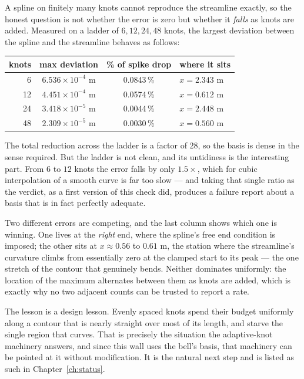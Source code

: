 A spline on finitely many knots cannot reproduce the streamline
exactly, so the honest question is not whether the error is zero but
whether it \emph{falls} as knots are added. Measured on a ladder of
$6, 12, 24, 48$ knots, the largest deviation between the spline and
the streamline behaves as follows:

\begin{center}
\begin{tabular}{rccl}
\toprule
knots & max deviation & \% of spike drop & where it sits \\
\midrule
 6 & $6.536\times10^{-4}$ m & 0.0843\,\% & $x = 2.343$ m \\
12 & $4.451\times10^{-4}$ m & 0.0574\,\% & $x = 0.612$ m \\
24 & $3.418\times10^{-5}$ m & 0.0044\,\% & $x = 2.448$ m \\
48 & $2.309\times10^{-5}$ m & 0.0030\,\% & $x = 0.560$ m \\
\bottomrule
\end{tabular}
\end{center}

The total reduction across the ladder is a factor of $28$, so the
basis is dense in the sense required. But the ladder is not clean, and
its untidiness is the interesting part. From $6$ to $12$ knots the
error falls by only $1.5\times$, which for cubic interpolation of a
smooth curve is far too slow --- and taking that single ratio as the
verdict, as a first version of this check did, produces a failure
report about a basis that is in fact perfectly adequate.

Two different errors are competing, and the last column shows which
one is winning. One lives at the \emph{right} end, where the spline's
free end condition is imposed; the other sits at $x \approx 0.56$ to
$0.61$ m, the station where the streamline's curvature climbs from
essentially zero at the clamped start to its peak --- the one stretch
of the contour that genuinely bends. Neither dominates uniformly:
the location of the maximum alternates between them as knots are
added, which is exactly why no two adjacent counts can be trusted to
report a rate.

The lesson is a design lesson. Evenly spaced knots spend their budget
uniformly along a contour that is nearly straight over most of its
length, and starve the single region that curves. That is precisely
the situation the adaptive-knot machinery answers, and since this wall
uses the bell's basis, that machinery can be pointed at it without
modification. It is the natural next step and is listed as such in
Chapter~\ref{ch:status}.

